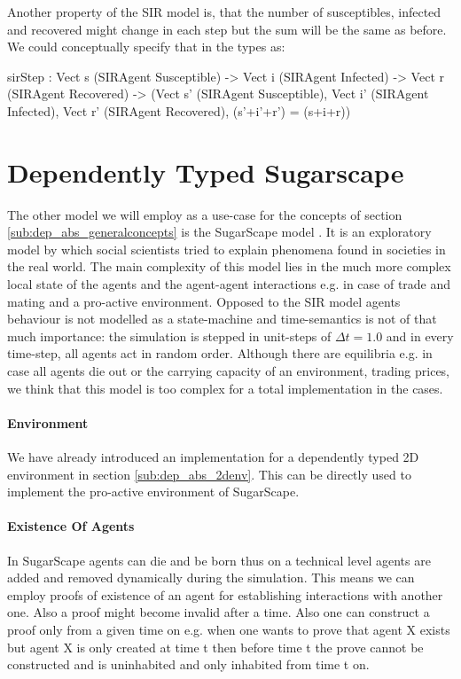 Another property of the SIR model is, that the number of susceptibles, infected and recovered might change in each step but the sum will be the same as before. We could conceptually specify that in the types as:
\begin{HaskellCode}
sirStep : Vect s (SIRAgent Susceptible) -> 
          Vect i (SIRAgent Infected) ->
          Vect r (SIRAgent Recovered) -> 
          (Vect s' (SIRAgent Susceptible),
           Vect i' (SIRAgent Infected), 
           Vect r' (SIRAgent Recovered), (s'+i'+r') = (s+i+r))
\end{HaskellCode}

\section{Dependently Typed Sugarscape}
\label{sec:dep_abs_sugarscape}
The other model we will employ as a use-case for the concepts of section \ref{sub:dep_abs_generalconcepts} is the SugarScape model \cite{epstein_growing_1996}. It is an exploratory model by which social scientists tried to explain phenomena found in societies in the real world. The main complexity of this model lies in the much more complex local state of the agents and the agent-agent interactions e.g. in case of trade and mating and a pro-active environment. Opposed to the SIR model agents behaviour is not modelled as a state-machine and time-semantics is not of that much importance: the simulation is stepped in unit-steps of $\Delta t = 1.0$ and in every time-step, all agents act in random order. Although there are equilibria e.g. in case all agents die out or the carrying capacity of an environment, trading prices, we think that this model is too complex for a total implementation in the cases.

\paragraph{Environment}
We have already introduced an implementation for a dependently typed 2D environment in section \ref{sub:dep_abs_2denv}. This can be directly used to implement the pro-active environment of SugarScape.

\paragraph{Existence Of Agents}
In SugarScape agents can die and be born thus on a technical level agents are added and removed dynamically during the simulation. This means we can employ proofs of existence of an agent for establishing interactions with another one. Also a proof might become invalid after a time. Also one can construct a proof only from a given time on e.g. when one wants to prove that agent X exists but agent X is only created at time t then before time t the prove cannot be constructed and is uninhabited and only inhabited from time t on.

